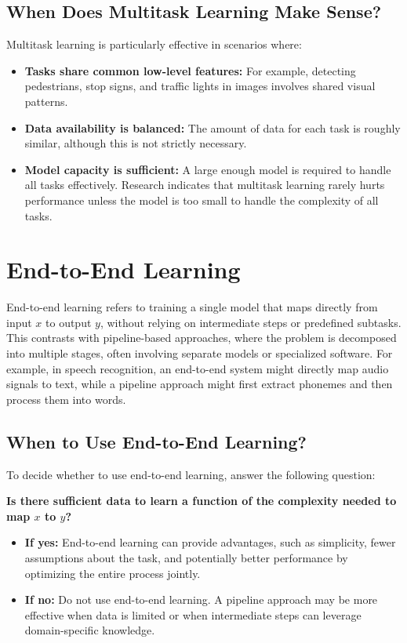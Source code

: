 \documentclass[12pt,openany]{book}
\begin{document}
\subsection{When Does Multitask Learning Make Sense?}

Multitask learning is particularly effective in scenarios where:
\begin{itemize}
    \item \textbf{Tasks share common low-level features:} For example, detecting pedestrians, stop signs, and traffic lights in images involves shared visual patterns.
    \item \textbf{Data availability is balanced:} The amount of data for each task is roughly similar, although this is not strictly necessary.
    \item \textbf{Model capacity is sufficient:} A large enough model is required to handle all tasks effectively. Research indicates that multitask learning rarely hurts performance unless the model is too small to handle the complexity of all tasks.
\end{itemize}


\section{End-to-End Learning}

End-to-end learning refers to training a single model that maps directly from input \(x\) to output \(y\), without relying on intermediate steps or predefined subtasks. This contrasts with pipeline-based approaches, where the problem is decomposed into multiple stages, often involving separate models or specialized software. For example, in speech recognition, an end-to-end system might directly map audio signals to text, while a pipeline approach might first extract phonemes and then process them into words.

\subsection{When to Use End-to-End Learning?}
To decide whether to use end-to-end learning, answer the following question: \newline

\textbf{Is there sufficient data to learn a function of the complexity needed to map \(x\) to \(y\)?} 
\begin{itemize}
    \item \textbf{If yes:} End-to-end learning can provide advantages, such as simplicity, fewer assumptions about the task, and potentially better performance by optimizing the entire process jointly.
    \item \textbf{If no:} Do not use end-to-end learning. A pipeline approach may be more effective when data is limited or when intermediate steps can leverage domain-specific knowledge.
\end{itemize}
\end{document}
